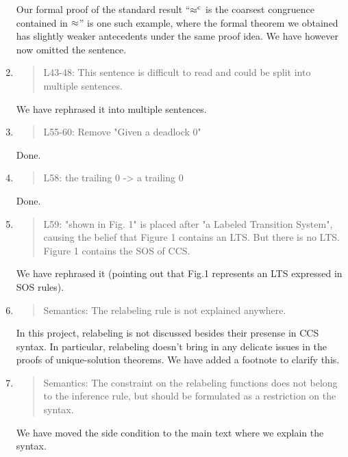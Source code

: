 \begin{enumerate}
  Our formal proof of the standard  result  ``$\mathrel{\approx^{\rm{c}}}$ is the
  coarsest congruence contained in $\approx$'' is one such example, where
  the formal theorem we obtained has slightly weaker antecedents under
  the same proof idea. We have however now omitted the sentence.

\item \begin{quote}
    L43-48: This sentence is difficult to read and could be split into multiple sentences.
  \end{quote}

  We have rephrased it into multiple sentences.
  
\item \begin{quote}
    L55-60: Remove "Given a deadlock 0"
  \end{quote}
  Done.
  
\item \begin{quote}
    L58: the trailing 0 -> a trailing 0
  \end{quote}
  Done.
  
\item \begin{quote}
    L59: "shown in Fig. 1" is placed after "a Labeled Transition
    System", causing the belief that Figure 1 contains an LTS. 
    But there is no LTS. Figure 1 contains the SOS of CCS.
  \end{quote}

  We have rephrased it (pointing out that Fig.1 represents an LTS expressed in SOS rules).

\item \begin{quote}
    Semantics: The relabeling rule is not explained anywhere.
  \end{quote}

  In this project, relabeling is not discussed besides their presense
  in CCS syntax. In particular, relabeling doesn't bring in any delicate issues
  in the proofs of unique-solution theorems.  We have added a footnote to clarify this.
  

\item \begin{quote}
    Semantics: The constraint on the relabeling functions does not belong to the inference rule, but should be formulated as a restriction on the syntax.
  \end{quote}
  We have moved the side condition to the main text where we explain
  the syntax.
  

\end{enumerate}
